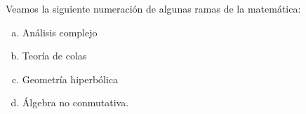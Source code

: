 \documentclass{article}
\begin{document}
Veamos la siguiente numeración de algunas ramas de la matemática:
\begin{enumerate}[a)]
\item Análisis complejo
\item Teoría de colas
\item Geometría hiperbólica
\item Álgebra no conmutativa.
\end{enumerate}
\end{document}
